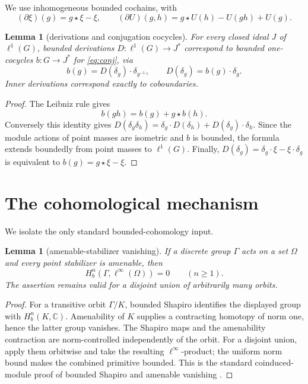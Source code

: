 \documentclass[11pt]{article}
\newtheorem{lemma}[theorem]{Lemma}
\newcommand{\C}{\mathbb C}
\newcommand{\Hb}{H_{\!b}}
\begin{document}
We use inhomogeneous bounded cochains, with
\[
 (\partial\xi)(g)=g\star\xi-\xi,
 \qquad
 (\partial U)(g,h)=g\star U(h)-U(gh)+U(g).
\]

\begin{lemma}[derivations and conjugation cocycles]\label{lem:dictionary}
For every closed ideal \(J\) of \(\ell^1(G)\), bounded derivations
\(D:\ell^1(G)\to J^*\) correspond to bounded one-cocycles
\(b:G\to J^*\) for \eqref{eq:conj}, via
\[
 b(g)=D(\delta_g)\cdot\delta_{g^{-1}},
 \qquad
 D(\delta_g)=b(g)\cdot\delta_g.
\]
Inner derivations correspond exactly to coboundaries.
\end{lemma}

\begin{proof}
The Leibniz rule gives
\[
 b(gh)=b(g)+g\star b(h).
\]
Conversely this identity gives
\(D(\delta_g\delta_h)=\delta_g\cdot D(\delta_h)+
D(\delta_g)\cdot\delta_h\).  Since the module actions of point masses are
isometric and \(b\) is bounded, the formula extends boundedly from point
masses to \(\ell^1(G)\).  Finally,
\(D(\delta_g)=\delta_g\cdot\xi-\xi\cdot\delta_g\) is equivalent to
\(b(g)=g\star\xi-\xi\).
\end{proof}

\section{The cohomological mechanism}

We isolate the only standard bounded-cohomology input.

\begin{lemma}[amenable-stabilizer vanishing]\label{lem:vanish}
If a discrete group \(\Gamma\) acts on a set \(\Omega\) and every point
stabilizer is amenable, then
\[
 \Hb^n(\Gamma,\ell^\infty(\Omega))=0\qquad(n\ge1).
\]
The assertion remains valid for a disjoint union of arbitrarily many orbits.
\end{lemma}

\begin{proof}
For a transitive orbit \(\Gamma/K\), bounded Shapiro identifies the displayed
group with \(\Hb^n(K,\C)\).  Amenability of \(K\) supplies a contracting
homotopy of norm one, hence the latter group vanishes.  The Shapiro maps and
the amenability contraction are norm-controlled independently of the orbit.
For a disjoint union, apply them orbitwise and take the resulting
\(\ell^\infty\)-product; the uniform norm bound makes the combined primitive
bounded.  This is the standard coinduced-module proof of bounded Shapiro and
amenable vanishing \cite[Chs.~7, 10]{Monod}.
\end{proof}
\end{document}
